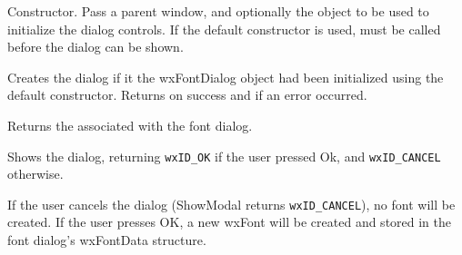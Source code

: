 \label{wxfontdialogctor}




Constructor. Pass a parent window, and optionally the 
 object to be used to initialize the dialog
controls. If the default constructor is used, 
 must be called before the dialog can be
shown.

\label{wxfontdialogcreate}



Creates the dialog if it the wxFontDialog object had been initialized using the
default constructor. Returns \true on success and \false if an error
occurred.

\label{wxfontdialoggetfontdata}



Returns the  associated with the font dialog.

\label{wxfontdialogshowmodal}


Shows the dialog, returning {\tt wxID\_OK} if the user pressed Ok, and 
{\tt wxID\_CANCEL} otherwise.

If the user cancels the dialog (ShowModal returns {\tt wxID\_CANCEL}), no font
will be created. If the user presses OK, a new wxFont will be created and
stored in the font dialog's wxFontData structure.

